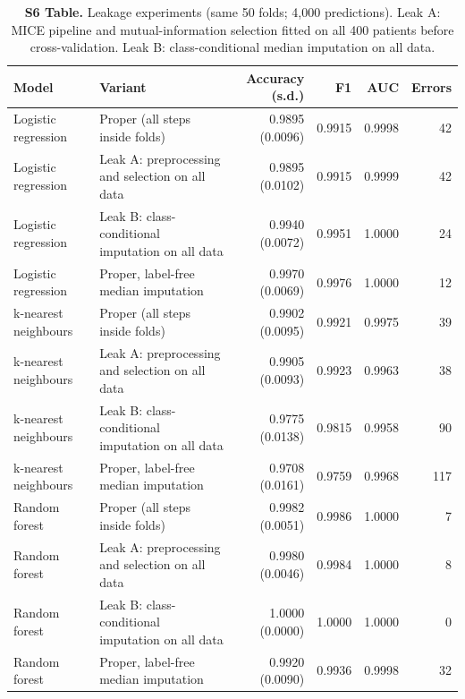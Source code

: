 \begin{table}[!ht]\centering\small
\caption{{\bf S6 Table.} Leakage experiments (same 50 folds; 4,000 predictions). Leak A: MICE pipeline and mutual-information selection fitted on all 400 patients before cross-validation. Leak B: class-conditional median imputation on all data.}
\begin{tabular}{lp{5.6cm}rrrr}\toprule
Model & Variant & Accuracy (s.d.) & F1 & AUC & Errors\\\midrule
Logistic regression & Proper (all steps inside folds) & 0.9895 (0.0096) & 0.9915 & 0.9998 & 42\\
Logistic regression & Leak A: preprocessing and selection on all data & 0.9895 (0.0102) & 0.9915 & 0.9999 & 42\\
Logistic regression & Leak B: class-conditional imputation on all data & 0.9940 (0.0072) & 0.9951 & 1.0000 & 24\\
Logistic regression & Proper, label-free median imputation & 0.9970 (0.0069) & 0.9976 & 1.0000 & 12\\
k-nearest neighbours & Proper (all steps inside folds) & 0.9902 (0.0095) & 0.9921 & 0.9975 & 39\\
k-nearest neighbours & Leak A: preprocessing and selection on all data & 0.9905 (0.0093) & 0.9923 & 0.9963 & 38\\
k-nearest neighbours & Leak B: class-conditional imputation on all data & 0.9775 (0.0138) & 0.9815 & 0.9958 & 90\\
k-nearest neighbours & Proper, label-free median imputation & 0.9708 (0.0161) & 0.9759 & 0.9968 & 117\\
Random forest & Proper (all steps inside folds) & 0.9982 (0.0051) & 0.9986 & 1.0000 & 7\\
Random forest & Leak A: preprocessing and selection on all data & 0.9980 (0.0046) & 0.9984 & 1.0000 & 8\\
Random forest & Leak B: class-conditional imputation on all data & 1.0000 (0.0000) & 1.0000 & 1.0000 & 0\\
Random forest & Proper, label-free median imputation & 0.9920 (0.0090) & 0.9936 & 0.9998 & 32\\
\bottomrule\end{tabular}\end{table}

